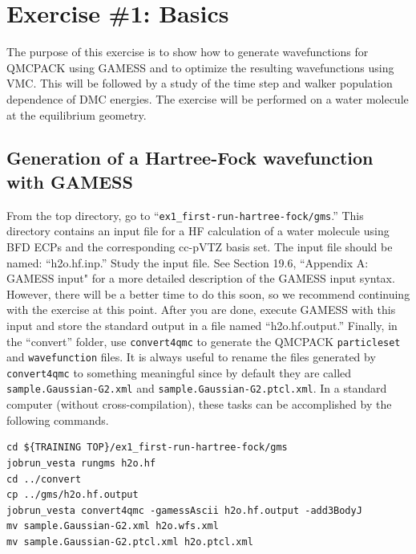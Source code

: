 \section{Exercise \#1: Basics}

The purpose of this exercise is to show how to generate wavefunctions for QMCPACK
using GAMESS and to optimize the resulting wavefunctions using VMC. This will be
followed by a study of the time step and walker population dependence of DMC energies.
The exercise will be performed on a water molecule at the equilibrium geometry.


\subsection{Generation of a Hartree-Fock wavefunction with GAMESS}

From the top directory, go to ``\texttt{ex1\_first-run-hartree-fock/gms}.'' This directory contains an input
file for a HF calculation of a water molecule using BFD ECPs and the corresponding
cc-pVTZ basis set. The input file should be named: “h2o.hf.inp.” Study the input
file. See Section 19.6, ``Appendix A: GAMESS input" for a more detailed description of the
GAMESS input syntax. However, there will be a better time to do this soon, so we recommend
continuing with the exercise at this point. After you are done, execute
GAMESS with this input and store the standard output in a file named ``h2o.hf.output.''
Finally, in the ``convert'' folder, use \texttt{convert4qmc} to generate the QMCPACK \texttt{particleset} and \texttt{wavefunction} files. It
is always useful to rename the files generated by \texttt{convert4qmc} to something meaningful
since by default they are called \texttt{sample.Gaussian-G2.xml} and \texttt{sample.Gaussian-G2.ptcl.xml}.
In a standard computer (without cross-compilation), these tasks can be accomplished by
the following commands.
\begin{lstlisting}[style=SHELL]
cd ${TRAINING TOP}/ex1_first-run-hartree-fock/gms
jobrun_vesta rungms h2o.hf 
cd ../convert
cp ../gms/h2o.hf.output
jobrun_vesta convert4qmc -gamessAscii h2o.hf.output -add3BodyJ
mv sample.Gaussian-G2.xml h2o.wfs.xml
mv sample.Gaussian-G2.ptcl.xml h2o.ptcl.xml
\end{lstlisting}
\noindent

